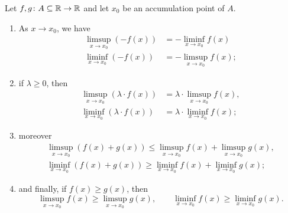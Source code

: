 \begin{theorem}
    Let $f,g\colon A\subseteq {\mathbb R}\to{\mathbb R}$ and let $x_0$ be an accumulation point of
  $A$.
  \begin{enumerate}
    \item 
      As $x\to x_0$, we have 
      \begin{align*}
      \limsup_{x\to x_0} (-f(x)) &= -\liminf_{x\to x_0} f(x)\\ 
      \liminf_{x\to x_0} (-f(x)) &= -\limsup_{x\to x_0} f(x);
      \end{align*}
    \item
      if $\lambda \ge 0$, then
        \begin{align*}
        \limsup_{x\to x_0} (\lambda \cdot f(x)) &= \lambda \cdot \limsup_{x\to x_0} f(x), \\
        \liminf_{x\to x_0} (\lambda \cdot f(x)) &= \lambda \cdot \liminf_{x\to x_0} f(x);
        \end{align*}
    \item
    moreover
    \begin{gather*}
    \limsup_{x\to x_0} (f(x) + g(x)) \le \limsup_{x\to x_0} f(x) + \limsup_{x\to x_0} g(x),\\
    \liminf_{x\to x_0} (f(x) + g(x)) \ge \liminf_{x\to x_0} f(x) + \liminf_{x\to x_0} g(x);
    \end{gather*}
    \item
    and finally, if $f(x) \ge g(x)$, then
    \[
     \limsup_{x\to x_0} f(x) \ge \limsup_{x\to x_0} g(x), \qquad \liminf_{x\to x_0} f(x) \ge \liminf_{x\to x_0} g(x).
    \]
  \end{enumerate}
\end{theorem}
%
